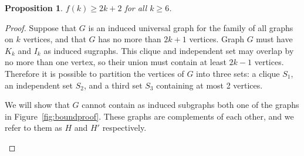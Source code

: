 \documentclass[12pt]{article}
\newtheorem{proposition}{Proposition}
\begin{document}
\begin{proposition}\label{f6proposition}
    $f(k) \geq 2k + 2$ for all $k \geq 6$.
\end{proposition}
\begin{proof}

    Suppose that $G$ is an induced universal graph for the family of all graphs
    on $k$ vertices, and that $G$ has no more than $2k + 1$ vertices.  Graph
    $G$ must have $K_k$ and $I_k$ as induced sugraphs.  This clique and
    independent set may overlap by no more than one vertex, so their union must
    contain at least $2k - 1$ vertices.  Therefore it is possible to partition
    the vertices of $G$ into three sets: a clique $S_1$, an independent set
    $S_2$, and a third set $S_3$ containing at most 2 vertices.

    We will show that $G$ cannot contain as induced subgraphs both
    one of the graphs in Figure~\ref{fig:boundproof}.  These graphs are complements
    of each other, and we refer to them as $H$ and $H'$ respectively.

\begin{figure}[htb]
    \centering


\end{figure}
\end{proof}
\end{document}
